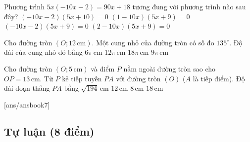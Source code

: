 \begin{ex}
Phương trình $5x(-10x-2)=90x+18$ tương đung với phương trình nào sau đây?
\choice
{$(-10x-2)(5x+10)=0$}
{$(1-10x)(5x+9)=0$}
{\True $(-10x-2)(5x+9)=0$}
{$(2-10x)(5x+9)=0$}
\end{ex}

\begin{ex}
Cho đường tròn $(O;12\,\text{cm})$. Một cung nhỏ của đường tròn có số đo $135^\circ$. Độ dài của cung nhỏ đó bằng
\choice
{$6\pi\,\text{cm}$}
{$12\pi\,\text{cm}$}
{$18\pi\,\text{cm}$}
{\True $9\pi\,\text{cm}$}
\end{ex}

\begin{ex}
Cho đường tròn $(O;5\,\text{cm})$ và điểm $P$ nằm ngoài đường tròn sao cho $OP=13\,\text{cm}$. Từ $P$ kẻ tiếp tuyến $PA$ với đường tròn $(O)$ ($A$ là tiếp điểm). Độ dài đoạn thẳng $PA$ bằng
\choice
{$\sqrt{194}\,\text{cm}$}
{\True $12\,\text{cm}$}
{$8\,\text{cm}$}
{$18\,\text{cm}$}
\end{ex}


[ans/ansbook7]
\setcounter{bt}{0}
\subsection{Tự luận (8 điểm)}


